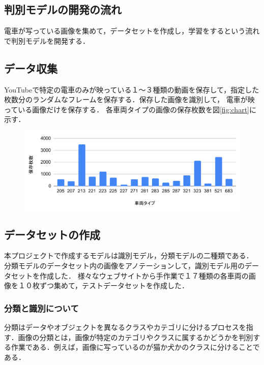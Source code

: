 \begin{multicols*}{2}
\section{判別モデルの開発の流れ}
電車が写っている画像を集めて，データセットを作成し，学習をするという流れで判別モデルを開発する．

\subsection{データ収集}
	YouTubeで特定の電車のみが映っている１〜３種類の動画を保存して，指定した枚数分のランダムなフレームを保存する．保存した画像を識別して，	電車が映っている画像だけを保存する．
各車両タイプの画像の保存枚数を図\ref{fig:chart}に示す．

\begin{figure}
	\centering
	\includegraphics[width=\linewidth]{obj/chart1.pdf}
\end{figure}
\subsection{データセットの作成}
本プロジェクトで作成するモデルは識別モデル，分類モデルの二種類である．%
分類モデルのデータセット内の画像をアノテーションして，識別モデル用のデータセットを作成した．
様々なウェブサイトから手作業で１７種類の各車両の画像を１０枚ずつ集めて，テストデータセットを作成した．

\subsubsection{分類と識別について}
分類はデータやオブジェクトを異なるクラスやカテゴリに分けるプロセスを指す．画像の分類とは，画像が特定のカテゴリやクラスに属するかどうかを判別する作業である．例えば，画像に写っているのが猫か犬かのクラスに分けることである．


\end{multicols*}

